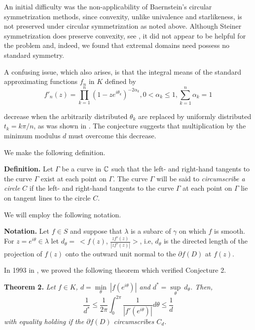 \documentclass[final]{siamltex}
\begin{document}
An initial difficulty was the non-applicability of Baernstein's
circular symmetrization methods, since convexity, unlike univalence
and starlikeness, is not preserved under circular symmetrization as noted above.
Although Steiner symmetrization does preserve convexity, see \cite{Valentine1}, it
did not appear to be helpful for the problem and, indeed, we found
that extremal domains need possess no standard symmetry.

A confusing issue, which also arises, is that the integral means of
the standard approximating functions $f_n$ in $K$ defined by
$$f'_n(z)=\prod^n_{k=1}(1-ze^{i\theta_k})^{-2\alpha_k},0<\alpha_k\leq
1,\sum^n_{k=1}\alpha_k=1$$ 

\noindent decrease when the arbitrarily distributed $\theta_k$ are replaced by
uniformly distributed $t_k=k\pi/n$, as was shown in \cite{Zheng1}.  The
conjecture suggests that multiplication by the minimum modulus $d$
must overcome this decrease.

We make the following definition.

\vspace{0.1in}

{\bf Definition.}  Let $\Gamma$ be a curve in $\Bbb C$ such that the
left- and right-hand tangents to the curve $\Gamma$ exist at each
point on $\Gamma$.  The curve $\Gamma$ will be said to {\em
circumscribe a circle} $C$ if the left- and right-hand tangents to
the curve $\Gamma$ at each point on $\Gamma$ lie on tangent lines to
the circle $C$.

\vspace{0.1in}

We will employ the following notation.

\vspace{0.1in}

{\bf Notation.} Let $f\in S$ and suppose that $\lambda$ is a subarc of
$\gamma$ on which $f$ is smooth.  For $z=e^{i\theta}\in\lambda$
let $d_{\theta} = \  <f(z)$, $\frac{zf'(z)}{|zf'(z)|}>$, i.e, $d_\theta$
is the directed length of the projection of $f(z)$ onto the outward
unit normal to the  $\partial f(D)$ at $f(z)$.

\vspace{0.1in}

In 1993 in \cite{BarnardPearce2}, we proved the following theorem which verified 
Conjecture 2.

\vspace{0.1in}

{\bf Theorem 2.} {\em Let $f\in K$, $d={\min\limits_\theta}\ 
|f(e^{i\theta})|$ and $d^*={\sup\limits_\theta} \  d_\theta$.
Then,
\begin{equation*}
\frac{1}{d^\ast}\leq\frac{1}{2\pi}\int^{2\pi}_{0}\frac{1}
{|f'(e^{i\theta})|}d\theta\leq\frac{1}{d} 
\end{equation*}
with equality holding if the  $\partial f(D)$ circumscribes $C_d$. }
\end{document}
